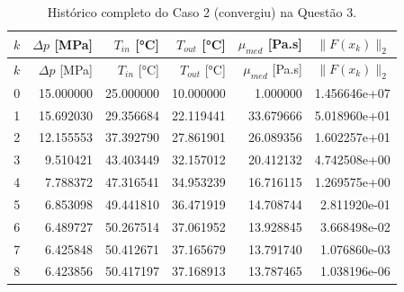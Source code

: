 \begin{longtable}{rrrrrr}
\caption{Histórico completo do Caso 2 (convergiu) na Questão 3.}\label{tab:iter-q3-2} \\
\toprule
$k$ & $\Delta p$ [MPa] & $T_{in}$ [°C] & $T_{out}$ [°C] & $\mu_{med}$ [Pa.s] & $\lVert F(x_k)\rVert_2$ \\
\midrule
\endfirsthead
\toprule
$k$ & $\Delta p$ [MPa] & $T_{in}$ [°C] & $T_{out}$ [°C] & $\mu_{med}$ [Pa.s] & $\lVert F(x_k)\rVert_2$ \\
\midrule
\endhead
0 & 15.000000 & 25.000000 & 10.000000 & 1.000000 & 1.456646e+07 \\
1 & 15.692030 & 29.356684 & 22.119441 & 33.679666 & 5.018960e+01 \\
2 & 12.155553 & 37.392790 & 27.861901 & 26.089356 & 1.602257e+01 \\
3 & 9.510421 & 43.403449 & 32.157012 & 20.412132 & 4.742508e+00 \\
4 & 7.788372 & 47.316541 & 34.953239 & 16.716115 & 1.269575e+00 \\
5 & 6.853098 & 49.441810 & 36.471919 & 14.708744 & 2.811920e-01 \\
6 & 6.489727 & 50.267514 & 37.061952 & 13.928845 & 3.668498e-02 \\
7 & 6.425848 & 50.412671 & 37.165679 & 13.791740 & 1.076860e-03 \\
8 & 6.423856 & 50.417197 & 37.168913 & 13.787465 & 1.038196e-06 \\
\bottomrule
\end{longtable}
